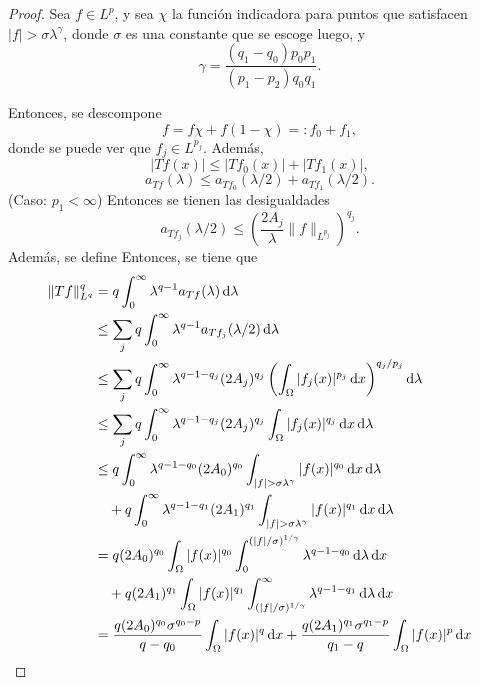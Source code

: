 \begin{proof}
	Sea $f\in L^p$, y sea $\chi$ la función indicadora para puntos que satisfacen $|f|>\sigma\lambda^\gamma$, donde $\sigma$ es una constante que se escoge luego, y \begin{equation*}
		\gamma = \frac{(q_1-q_0)p_0p_1}{(p_1-p_2)q_0q_1}.
	\end{equation*}
	
	Entonces, se descompone
	\begin{equation*}
		f = f\chi + f(1-\chi) =: f_0 + f_1,
	\end{equation*}
	donde se puede ver que $f_j \in L^{p_j}$. Además, 
	\begin{equation*}
		|Tf(x)|  \leq |Tf_0(x)| + |Tf_1(x)|, 
	\end{equation*}
	\begin{equation*}
		a_{Tf}(\lambda) \leq a_{Tf_0}(\lambda/2) + a_{Tf_1}(\lambda/2).
	\end{equation*}
	(Caso: $p_1<\infty$)  Entonces se tienen las desigualdades 
	\begin{equation*}
		a_{Tf_j}(\lambda/2) \leq \left(\frac{2A_j}{\lambda}\|f\|_{L^{p_j}}\right)^{q_j}.
	\end{equation*}
	Además, se define 
	Entonces, se tiene que 
	\begin{align*}
		\|Tf\|_{L^q}^q & = q\int_0^\infty\lambda^{q-1}a_{Tf}(\lambda) \diff \lambda \\
		& \leq \sum_j q\int_0^\infty\lambda^{q-1}a_{Tf_j}(\lambda/2) \diff \lambda \\
		& \leq \sum_j q\int_0^\infty\lambda^{q-1-q_j} (2A_j)^{q_j}\left( \int_\Omega |f_j(x)|^{p_j}\diff x \right)^{q_j/p_j}\diff \lambda\\ 
		& \leq \sum_j q\int_0^\infty\lambda^{q-1-q_j} (2A_j)^{q_j}\int_\Omega |f_j(x)|^{q_j}\diff x \diff \lambda\\
		& \leq q\int_0^\infty\lambda^{q-1-q_0} (2A_0)^{q_0}\int_{|f|>\sigma\lambda^\gamma} |f(x)|^{q_0}\diff x \diff \lambda\\
		& \quad + q\int_0^\infty\lambda^{q-1-q_1} (2A_1)^{q_1} \int_{|f|>\sigma\lambda^\gamma} |f(x)|^{q_1}\diff x \diff \lambda\\
		& = q(2A_0)^{q_0} \int_\Omega |f(x)|^{q_0} \int_0^{(|f|/\sigma)^{1/\gamma}} \lambda^{q-1-q_0} \diff\lambda \diff x \\
		& \quad + q(2A_1)^{q_1} \int_\Omega |f(x)|^{q_1} \int_{(|f|/\sigma)^{1/\gamma}}^{\infty} \lambda^{q-1-q_1} \diff\lambda \diff x \\
		& = \frac{q(2A_0)^{q_0}\sigma^{q_0-p}}{q-q_0} \int_\Omega |f(x)|^q \diff x + \frac{q(2A_1)^{q_1}\sigma^{q_1-p}}{q_1-q} \int_\Omega |f(x)|^p \diff x \\

\end{align*}
\end{proof}
